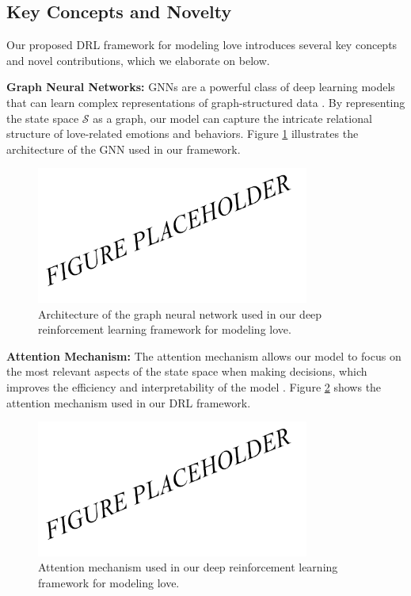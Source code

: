 \subsection{Key Concepts and Novelty}

Our proposed DRL framework for modeling love introduces several key concepts and novel contributions, which we elaborate on below.

\textbf{Graph Neural Networks:} GNNs are a powerful class of deep learning models that can learn complex representations of graph-structured data \citep{battaglia2018relational}. By representing the state space $\mathcal{S}$ as a graph, our model can capture the intricate relational structure of love-related emotions and behaviors. Figure \ref{fig:gnn} illustrates the architecture of the GNN used in our framework.

\begin{figure}[h]
    \centering
    \includegraphics[width=0.8\textwidth]{fig2.png}
    \caption{Architecture of the graph neural network used in our deep reinforcement learning framework for modeling love.}
    \label{fig:gnn}
\end{figure}

\textbf{Attention Mechanism:} The attention mechanism allows our model to focus on the most relevant aspects of the state space when making decisions, which improves the efficiency and interpretability of the model \citep{vaswani2017attention}. Figure \ref{fig:attention} shows the attention mechanism used in our DRL framework.

\begin{figure}[h]
    \centering
    \includegraphics[width=0.8\textwidth]{fig3.png}
    \caption{Attention mechanism used in our deep reinforcement learning framework for modeling love.}
    \label{fig:attention}
\end{figure}


